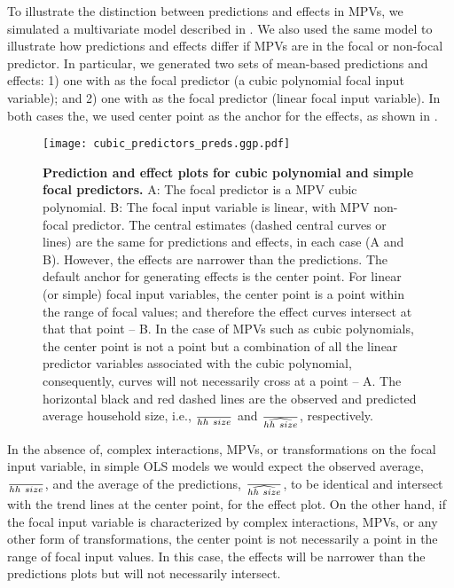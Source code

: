 To illustrate the distinction between predictions and effects in MPVs, we simulated a multivariate model described in . We also used the same model to illustrate how predictions and effects differ if MPVs are in the focal or non-focal predictor. In particular, we generated two sets of mean-based predictions and effects: 1) one with  as the focal predictor (a cubic polynomial focal input variable); and 2) one with  as the focal predictor (linear focal input variable). In both cases the, we used center point as the anchor for the effects, as shown in .

\begin{figure}
\begin{center}
\texttt{[image: cubic\_predictors\_preds.ggp.pdf]}
\end{center}
\caption{{\bf Prediction and effect plots for cubic polynomial and simple focal predictors.} A: The focal predictor is a MPV cubic polynomial. B: The focal input variable is linear, with MPV non-focal predictor. The central estimates (dashed central curves or lines) are the same for predictions and effects, in each case (A and B). However, the effects are narrower than the predictions. The default anchor for generating effects is the center point. For linear (or simple) focal input variables, the center point is a point within the range of focal values; and therefore the effect curves intersect at that that point -- B. In the case of MPVs such as cubic polynomials, the center point is not a point but a combination of all the linear predictor variables associated with the cubic polynomial, consequently, curves will not necessarily cross at a point -- A. The horizontal black and red dashed lines are the observed and predicted average household size, i.e., $\over{hh~size}$ and $\over{\widehat{hh~size}}$, respectively.}
\label{fig:pred_cubic_plots}
\end{figure}

In the absence of, complex interactions, MPVs, or transformations on the focal input variable, in simple OLS models we would expect the observed average, $\over{hh~size}$, and the average of the predictions, $\over{\widehat{hh~size}}$, to be identical and intersect with the trend lines at the center point, for the effect plot. On the other hand, if the focal input variable is characterized by complex interactions, MPVs, or any other form of transformations, the center point is not necessarily a point in the range of focal input values. In this case, the effects will be narrower than the predictions plots but will not necessarily intersect. 


